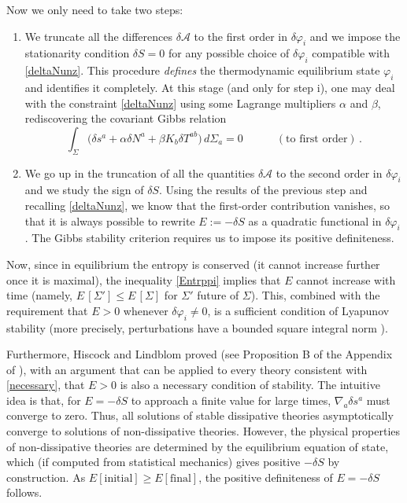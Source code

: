 \documentclass[a4paper, amsfonts, amssymb, amsmath, reprint, showkeys, nofootinbib, twoside, onecolumn,notitlepage]{revtex4-1}
\newcommand{\spc}{\quad \quad \quad}
\begin{document}
Now we only need to take two steps:
\begin{enumerate}
\item[i -] We truncate all the differences $\delta \mathcal{A}$ to the first order in $\delta \varphi_i$ and we impose the stationarity condition $\delta S=0$ for any possible choice of $\delta \varphi_i$ compatible with \eqref{deltaNunz}. This procedure \textit{defines} the thermodynamic equilibrium state $\varphi_i$ and identifies it completely. At this stage (and only for step i), one may deal with the constraint \eqref{deltaNunz} using some Lagrange multipliers $\alpha$ and $\beta$, rediscovering the covariant Gibbs relation \cite{Israel_Stewart_1979,VANWEERT1982,Israel_2009_inbook} 
\begin{equation}
\int_\Sigma \big(\delta s^a + \alpha \delta N^a + \beta K_b \delta T^{ab} \big) \,d\Sigma_a =0 \spc (\text{to first order}) \, .
\end{equation} 
\item[ii -] We go up in the truncation of all the quantities $\delta \mathcal{A}$ to the second order in $\delta \varphi_i$ and we study the sign of $\delta S$. Using the results of the previous step and recalling \eqref{deltaNunz}, we know that the first-order contribution vanishes, so that it is always possible to rewrite $E:=-\delta S$ as a quadratic functional in $\delta \varphi_i$. The Gibbs stability criterion requires us to impose its positive definiteness. 
\end{enumerate}
Now, since in equilibrium the entropy is conserved (it cannot increase further once it is maximal), the inequality \eqref{Entrppi} implies that $E$ cannot increase with time (namely, $E \,[\Sigma'] \leq E \,[\Sigma]$ for $\Sigma'$ future of $\Sigma$). This, combined with the requirement that $E > 0$ whenever $\delta \varphi_i \neq 0$, is a sufficient condition of Lyapunov stability (more precisely, perturbations have a bounded square integral norm \cite{Hishcock1983,GerochLindblom1990}). 

Furthermore, Hiscock and Lindblom proved (see Proposition B of the Appendix of \cite{Hishcock1983}), with an argument that can be applied to every theory consistent with \eqref{necessary}, that $E>0$ is also a necessary condition of stability. The intuitive idea is that, for $E=-\delta S$ to approach a finite value for large times, $\nabla_a \delta s^a$ must converge to zero. Thus, all solutions of stable dissipative theories asymptotically converge to solutions of non-dissipative theories. However, the physical properties of non-dissipative theories are determined by the equilibrium equation of state, which (if computed from statistical mechanics) gives positive $-\delta S$ by construction. As $E[\text{initial}]\geq E[\text{final}]$, the positive definiteness of $E=-\delta S$ follows.
\end{document}
